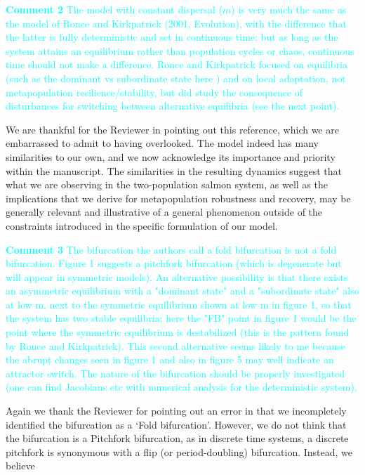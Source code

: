 \documentclass[ucm,12pt]{ucletter}
\begin{document}
\begin{letter}
\noindent \textcolor{cyan}{
{\bf Comment 2} The model with constant dispersal ($m$) is very much the same as the model of Ronce and Kirkpatrick (2001, Evolution), with the difference that the latter is fully deterministic and set in continuous time; but as long as the system attains an equilibrium rather than population cycles or chaos, continuous time should not make a difference. Ronce and Kirkpatrick focused on equilibria (such as the dominant vs subordinate state here ) and on local adaptation, not metapopulation resilience/stability, but did study the consequence of disturbances for switching between alternative equilibria (see the next point).
}

 We are thankful for the Reviewer in pointing out this reference, which we are embarrassed to admit to having overlooked. The model indeed has many similarities to our own, and we now acknowledge its importance and priority within the manuscript. The similarities in the resulting dynamics suggest that what we are observing in the two-population salmon system, as well as the implications that we derive for metapopulation robustness and recovery, may be generally relevant and illustrative of a general phenomenon outside of the constraints introduced in the specific formulation of our model.


\noindent \textcolor{cyan}{
{\bf Comment 3} The bifurcation the authors call a fold bifurcation is not a fold bifurcation. Figure 1 suggests a pitchfork bifurcation (which is degenerate but will appear in symmetric models). An alternative possibility is that there exists an asymmetric equilibrium with a "dominant state" and a "subordinate state" also at low m, next to the symmetric equilibrium shown at low m in figure 1, so that the system has two stable equilibria; here the "FB" point in figure 1 would be the point where the symmetric equilibrium is destabilized (this is the pattern found by Ronce and Kirkpatrick). This second alternative seems likely to me because the abrupt changes seen in figure 1 and also in figure 5 may well indicate an attractor switch. The nature of the bifurcation should be properly investigated (one can find Jacobians etc with numerical analysis for the deterministic system).
}

 Again we thank the Reviewer for pointing out an error in that we incompletely identified the bifurcation as a `Fold bifurcation'. However, we do not think that the bifurcation is a Pitchfork bifurcation, as in discrete time systems, a discrete pitchfork is synonymous with a flip (or period-doubling) bifurcation. Instead, we believe


\end{letter}
\end{document}
